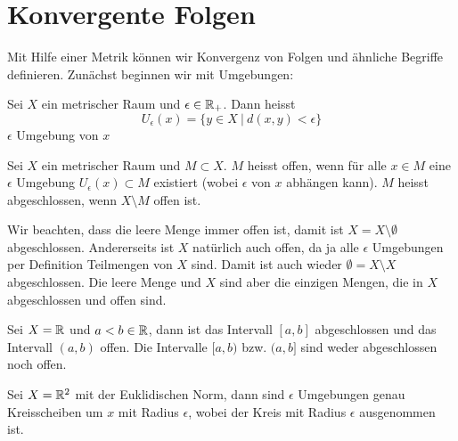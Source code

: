 \section{Konvergente Folgen}
\label{\detokenize{metrik/konvfolgen:konvergente-folgen}}\label{\detokenize{metrik/konvfolgen::doc}}
Mit Hilfe einer Metrik können wir Konvergenz von Folgen und ähnliche Begriffe definieren. Zunächst beginnen wir mit Umgebungen:
\label{metrik/konvfolgen:definition-0}
\begin{definition}{}{}



Sei \(X\) ein metrischer Raum und \(\epsilon \in \mathbb{R}_+\). Dann heisst
\begin{equation*}
 U_\epsilon(x) = \{ y \in X~|~d(x,y) < \epsilon \}
\end{equation*}
\(\epsilon\) Umgebung von \(x\)
\end{definition}
\label{metrik/konvfolgen:definition-1}
\begin{definition}{}{}



Sei \(X\) ein metrischer Raum und \(M \subset X\). \(M\) heisst offen, wenn für alle \(x \in M\) eine \(\epsilon\) Umgebung \(U_\epsilon(x) \subset M\) existiert (wobei \(\epsilon\) von \(x\) abhängen kann). \(M\) heisst abgeschlossen, wenn \(X \setminus M\) offen ist.
\end{definition}

Wir beachten, dass die leere Menge immer offen ist, damit ist \(X =X \setminus \emptyset\) abgeschlossen. Andererseits ist \(X\) natürlich auch offen, da ja alle \(\epsilon\) Umgebungen per Definition Teilmengen von \(X\) sind. Damit ist auch wieder \(\emptyset =  X \setminus X\) abgeschlossen. Die leere Menge und \(X\) sind aber die einzigen Mengen, die in \(X\) abgeschlossen und offen sind.
\label{metrik/konvfolgen:example-2}
\begin{example}{}{}



Sei \(X=\mathbb{R}\) und \(a < b \in \mathbb{R}\), dann ist das Intervall \([a,b]\) abgeschlossen und das Intervall \((a,b)\) offen. Die Intervalle \([a,b)\) bzw. \((a,b]\) sind weder abgeschlossen noch offen.
\end{example}
\label{metrik/konvfolgen:example-3}
\begin{example}{}{}



Sei \(X=\mathbb{R}^2\) mit der Euklidischen Norm, dann sind \(\epsilon\) Umgebungen genau Kreisscheiben um \(x\) mit Radius \(\epsilon\), wobei der Kreis mit Radius \(\epsilon\) ausgenommen ist.
\end{example}


